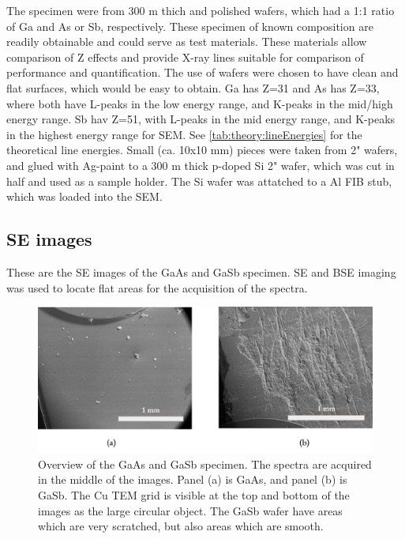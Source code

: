 The specimen were from 300 \textmu m thich and polished wafers, which had a 1:1 ratio of Ga and As or Sb, respectively.
These specimen of known composition are readily obtainable and could serve as test materials.
These materials allow comparison of Z effects and provide X-ray lines suitable for comparison of performance and quantification.
The use of wafers were chosen to have clean and flat surfaces, which would be easy to obtain.
Ga has Z=31 and As has Z=33, where both have L-peaks in the low energy range, and K-peaks in the mid/high energy range.
Sb hav Z=51, with L-peaks in the mid energy range, and K-peaks in the highest energy range for SEM.
See \cref{tab:theory:lineEnergies} for the theoretical line energies.
Small (ca. 10x10 mm) pieces were taken from 2" wafers, and glued with Ag-paint to a 300 \textmu m thick p-doped Si 2" wafer, which was cut in half and used as a sample holder.
The Si wafer was attatched to a Al FIB stub, which was loaded into the SEM.




\subsection{SE images}
\label{method:SE_images}

These are the SE images of the GaAs and GaSb specimen.
SE and BSE imaging was used to locate flat areas for the acquisition of the spectra.

\begin{figure}[htbp]
    \centering
    \includegraphics[width=.95\textwidth]{figures/SE_images/Overview_GaAs_GaSb.jpg}
    \caption{
        Overview of the GaAs and GaSb specimen.
        The spectra are acquired in the middle of the images.
        Panel (a) is GaAs, and panel (b) is GaSb.
        The Cu TEM grid is visible at the top and bottom of the images as the large circular object.
        The GaSb wafer have areas which are very scratched, but also areas which are smooth.
    }
    \label{fig:SE_images:Overview_GaAs_GaSb}
\end{figure}

